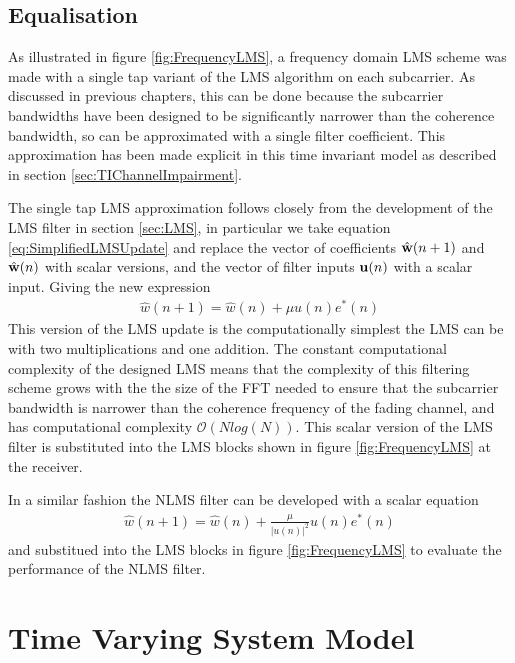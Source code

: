 \subsection{Equalisation}
\label{subsec:Equalisation}
As illustrated in figure \ref{fig:FrequencyLMS}, a frequency domain %
LMS scheme was made with a single tap variant of the LMS algorithm on %
each subcarrier. As discussed in previous chapters, this can be done %
because the subcarrier bandwidths have been designed to be significantly %
narrower than the coherence bandwidth, so can be approximated with a %
single filter coefficient. This approximation has been made explicit in this %
time invariant model as described in section \ref{sec:TIChannelImpairment}. %

The single tap LMS approximation follows closely from the development of the %
LMS filter in section \ref{sec:LMS}, in particular we take equation \ref{eq:SimplifiedLMSUpdate} %
and replace the vector of coefficients $\hat{\bold{w}}(n+1)$ and $\hat{\bold{w}}(n)$ with scalar %
versions, and the vector of filter inputs $\bold{u}(n)$ with a scalar input. Giving the %
new expression
\begin{align}
	\hat{w}(n+1) = \hat{w}(n) + \mu u(n) e^{*}(n)
	\label{eq:ScalarLMS}
\end{align}
This version of the LMS update is the computationally simplest %
the LMS can be with two multiplications and one addition. %
The constant computational complexity of the designed LMS means %
that the complexity of this filtering scheme grows with the %
the size of the FFT needed to ensure that the subcarrier bandwidth %
is narrower than the coherence frequency of the fading channel, and %
has computational complexity $\mathcal{O}(N log(N))$. This scalar version %
of the LMS filter is substituted into the LMS blocks shown in figure %
\ref{fig:FrequencyLMS} at the receiver.

In a similar fashion the NLMS filter can be developed with a scalar equation %
\begin{align}
	\hat{w}(n+1) = \hat{w}(n) + \frac{\mu}{\lvert u(n) \rvert^{2}} %
	u(n) e^{*}(n)
	\label{eq:ScalarNLMS}
\end{align}
and substitued into the LMS blocks in figure \ref{fig:FrequencyLMS} to %
evaluate the performance of the NLMS filter.

\section{Time Varying System Model}

